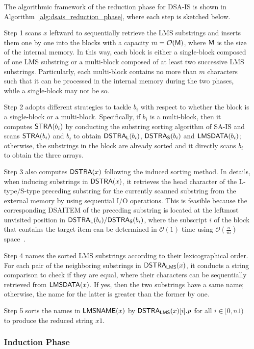 \documentclass[10pt,journal,compsoc]{IEEEtran}
\begin{document}
The algorithmic framework of the reduction phase for DSA-IS is shown in Algorithm~\ref{alg:dsais_reduction_phase}, where each step is sketched below.

Step 1 scans $x$ leftward to sequentially retrieve the LMS substrings and inserts them one by one into the blocks with a capacity $m = \mathcal{O}(\sf M)$, where ${\sf M}$ is the size of the internal memory. In this way, each block is either a single-block composed of one LMS substring or a multi-block composed of at least two successive LMS substrings. Particularly, each multi-block contains no more than $m$ characters such that it can be processed in the internal memory during the two phases, while a single-block may not be so.

Step 2 adopts different strategies to tackle $b_i$ with respect to whether the block is a single-block or a multi-block. Specifically, if $b_i$ is a multi-block, then it computes ${\sf STRA}(b_i)$ by conducting the substring sorting algorithm of SA-IS and scans ${\sf STRA}(b_i)$ and $b_i$ to obtain ${\sf DSTRA_L}(b_i)$, ${\sf DSTRA_S}(b_i)$ and ${\sf LMSDATA}(b_i)$; otherwise, the substrings in the block are already sorted and it directly scans $b_i$ to obtain the three arrays.

Step 3 also computes ${\sf DSTRA}(x)$ following the induced sorting method. In details, when inducing substrings in ${\sf DSTRA}(x)$, it retrieves the head character of the L-type/S-type preceding substring for the currently scanned substring from the external memory by using sequential I/O operations. This is feasible because the corresponding DSAITEM of the preceding substring is located at the leftmost unvisited position in ${\sf DSTRA_L}(b_i)/{\sf DSTRA_S}(b_i)$, where the subscript $i$ of the block that contains the target item can be determined in $\mathcal{O}(1)$ time using $\mathcal{O}(\frac{n}{m})$ space~\cite{Nong2015}.

Step 4 names the sorted LMS substrings according to their lexicographical order. For each pair of the neighboring substrings in ${\sf DSTRA_{LMS}}(x)$, it conducts a string comparison to check if they are equal, where their characters can be sequentially retrieved from ${\sf LMSDATA}(x)$. If yes, then the two substrings have a same name; otherwise, the name for the latter is greater than the former by one.

Step 5 sorts the names in ${\sf LMSNAME}(x)$ by ${\sf DSTRA_{LMS}}(x)[i].p$ for all $i \in [0, n1)$ to produce the reduced string $x1$.

\subsubsection{Induction Phase}
\end{document}
